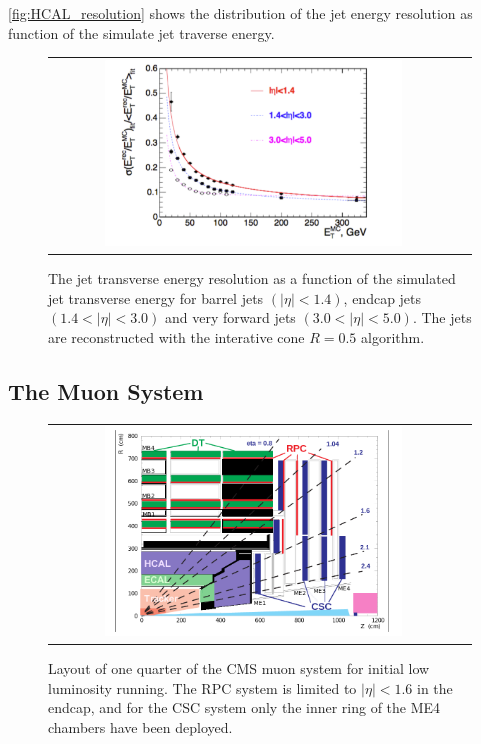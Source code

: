 \autoref{fig:HCAL_resolution} shows the distribution of the jet energy resolution as function of the simulate jet traverse energy.

\begin{figure}[tbh!]
	\centering
	\begin{tabular}{cc}
		\includegraphics[width=0.75\textwidth]{detector/pics/HCAL_resolution.pdf}
	\end{tabular}
	\caption{The jet transverse energy resolution as a function of the simulated jet transverse energy for barrel jets $(|\eta| < 1.4)$, endcap jets $(1.4 < |\eta| < 3.0)$ and very forward jets $(3.0 < | \eta | < 5.0)$. The jets are reconstructed with the interative cone $R = 0.5$ algorithm.}
	\label{fig:HCAL_resolution}
\end{figure}

\clearpage

\subsection{The Muon System}

\begin{figure}[tbh!]
	\centering
	\begin{tabular}{cc}
		\includegraphics[width=0.75\textwidth]{detector/pics/CMS_muonsys.png}
	\end{tabular}
	\caption{Layout of one quarter of the CMS muon system for initial low luminosity running.
		The RPC system is limited to $|\eta| < 1.6$ in the endcap, and for the CSC system only the inner
		ring of the ME4 chambers have been deployed.}
	\label{fig:CMS_muonsys}
\end{figure}

